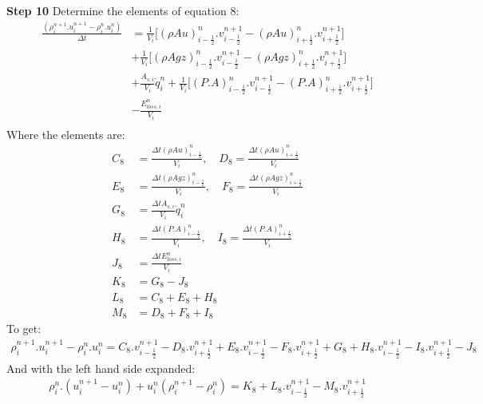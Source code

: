 \documentclass[11pt,letterpaper,titlepage]{article}
\newcommand{\half}{\frac{1}{2}}
\begin{document}
\newpage \noindent
\textbf{Step 10}\newline
Determine the elements of equation 8:
\begin{equation*}
\begin{aligned}
 \frac{(\rho_i^{n+1}.u_i^{n+1}-  \rho_i^{n}.u_i^{n})}{\Delta t}&=\frac{1}{V_i}\biggr[ (\rho Au)_{i-\half}^n.v_{i-\half}^{n+1} -(\rho Au)_{i+\half}^n.v_{i+\half}^{n+1} \biggr] \\
&+\frac{1}{V_i}\biggr[ (\rho Agz)_{i-\half}^n.v_{i-\half}^{n+1} -(\rho Agz)_{i+\half}^n.v_{i+\half}^{n+1} \biggr] \\
&+\frac{A_{s,i}}{V_i}\dot{q}_i^n + \frac{1}{V_i}\biggr[   (P.A)_{i-\half}^n.v_{i-\half}^{n+1} - (P.A)_{i+\half}^n.v_{i+\half}^{n+1}   \biggr] \\
&- \frac{E_{loss,i}^n}{V_i} \\
\end{aligned}
\end{equation*}
\newline
Where the elements are:
\begin{equation*}
\begin{aligned}
C_8&=\frac{\Delta t (\rho Au)_{i-\half}^n}{V_i}, \quad D_8=\frac{\Delta t (\rho Au)_{i+\half}^n}{V_i} \\
E_8&=\frac{\Delta t (\rho Agz)_{i-\half}^n}{V_i}, \quad F_8=\frac{\Delta t (\rho Agz)_{i+\half}^n}{V_i}\\
G_8&=\frac{\Delta t A_{s,i}}{V_i}\dot{q}_i^n \\
H_8&=\frac{\Delta t (P.A)_{i-\half}^n}{V_i}, \quad I_8=\frac{\Delta t (P.A)_{i+\half}^n}{V_i} \\
J_8&=\frac{\Delta t E_{loss,i}^n}{V_i} \\
K_8&=G_8-J_8 \\
L_8&=C_8+E_8+H_8 \\
M_8&=D_8+F_8+I_8
\end{aligned}
\end{equation*}
\newline
To get:
\begin{equation*}
\begin{aligned}
\rho_i^{n+1}.u_i^{n+1}-\rho_i^{n}.u_i^{n}=C_8.v_{i-\half}^{n+1}-D_8.v_{i+\half}^{n+1}+E_8.v_{i-\half}^{n+1}-F_8.v_{i+\half}^{n+1}+G_8+H_8.v_{i-\half}^{n+1}-I_8.v_{i+\half}^{n+1}-J_8
\end{aligned}
\end{equation*}
And with the left hand side expanded:
\begin{equation}
\begin{aligned}
\rho_i^{n}.(u_i^{n+1}-u_i^{n}) + u_i^{n}(\rho_i^{n+1}-\rho_i^{n})=K_8+L_8.v_{i-\half}^{n+1}-M_8.v_{i+\half}^{n+1}
\end{aligned}
\end{equation}
\end{document}
